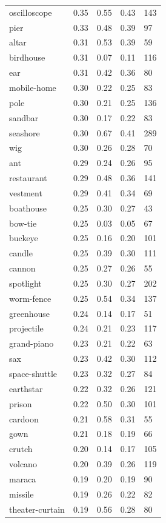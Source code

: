 \begin{center}
\begin{longtable}{lllll}
oscilloscope & 0.35 & 0.55 & 0.43 & 143 \\
pier & 0.33 & 0.48 & 0.39 & 97 \\
altar & 0.31 & 0.53 & 0.39 & 59 \\
birdhouse & 0.31 & 0.07 & 0.11 & 116 \\
ear & 0.31 & 0.42 & 0.36 & 80 \\
mobile-home & 0.30 & 0.22 & 0.25 & 83 \\
pole & 0.30 & 0.21 & 0.25 & 136 \\
sandbar & 0.30 & 0.17 & 0.22 & 83 \\
seashore & 0.30 & 0.67 & 0.41 & 289 \\
wig & 0.30 & 0.26 & 0.28 & 70 \\
ant & 0.29 & 0.24 & 0.26 & 95 \\
restaurant & 0.29 & 0.48 & 0.36 & 141 \\
vestment & 0.29 & 0.41 & 0.34 & 69 \\
boathouse & 0.25 & 0.30 & 0.27 & 43 \\
bow-tie & 0.25 & 0.03 & 0.05 & 67 \\
buckeye & 0.25 & 0.16 & 0.20 & 101 \\
candle & 0.25 & 0.39 & 0.30 & 111 \\
cannon & 0.25 & 0.27 & 0.26 & 55 \\
spotlight & 0.25 & 0.30 & 0.27 & 202 \\
worm-fence & 0.25 & 0.54 & 0.34 & 137 \\
greenhouse & 0.24 & 0.14 & 0.17 & 51 \\
projectile & 0.24 & 0.21 & 0.23 & 117 \\
grand-piano & 0.23 & 0.21 & 0.22 & 63 \\
sax & 0.23 & 0.42 & 0.30 & 112 \\
space-shuttle & 0.23 & 0.32 & 0.27 & 84 \\
earthstar & 0.22 & 0.32 & 0.26 & 121 \\
prison & 0.22 & 0.50 & 0.30 & 101 \\
cardoon & 0.21 & 0.58 & 0.31 & 55 \\
gown & 0.21 & 0.18 & 0.19 & 66 \\
crutch & 0.20 & 0.14 & 0.17 & 105 \\
volcano & 0.20 & 0.39 & 0.26 & 119 \\
maraca & 0.19 & 0.20 & 0.19 & 90 \\
missile & 0.19 & 0.26 & 0.22 & 82 \\
theater-curtain & 0.19 & 0.56 & 0.28 & 80 \\

\end{longtable}
\end{center}
